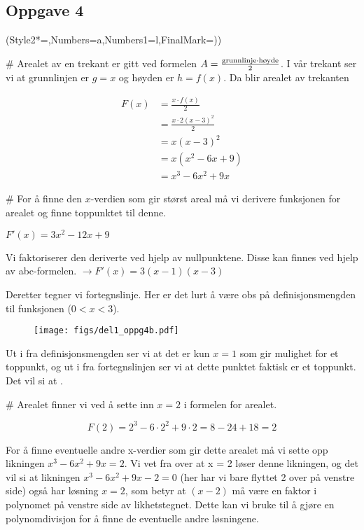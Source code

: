 \subsection*{Oppgave 4}
\begin{easylist}[enumerate]
	\ListProperties(Style2*=,Numbers=a,Numbers1=l,FinalMark={)})
	
	# Arealet av en trekant er gitt ved formelen $A = \frac{\textnormal{grunnlinje} \cdot \textnormal{høyde}}{2}$. I vår trekant ser vi at grunnlinjen er $g = x$ og høyden er $h = f(x)$. Da blir arealet av trekanten
	
	\begin{align*}
		F(x) & = \frac{x \cdot f(x)}{2} \\
		& = \frac{x \cdot 2(x-3)^2}{2} \\
		& = x(x-3)^2 \\
		& = x(x^2 - 6x + 9) \\
		& = x^3 - 6x^2 +9x
	\end{align*}
	
	# For å finne den $x$-verdien som gir størst areal må vi derivere funksjonen for arealet og finne toppunktet til denne. 
	
	$F'(x) = 3x^2 - 12x + 9$
	
	Vi faktoriserer den deriverte ved hjelp av nullpunktene. Disse kan finnes ved hjelp av abc-formelen. $\rightarrow F'(x) = 3(x-1)(x-3)$
	
	Deretter tegner vi fortegnslinje. Her er det lurt å være obs på definisjonsmengden til funksjonen ($0<x<3$).
	
		\begin{figure}[ht!]
			\centering
			\texttt{[image: figs/del1\_oppg4b.pdf]}
			\label{fig:del1_oppg4c}
		\end{figure}
		
		Ut i fra definisjonsmengden ser vi at det er kun $x = 1$ som gir mulighet for et toppunkt, og ut i fra fortegnslinjen ser vi at dette punktet faktisk er et toppunkt. Det vil si at .
		
	# Arealet finner vi ved å sette inn $x = 2$ i formelen for arealet.
	
	\[ F(2) = 2^3 - 6 \cdot 2^2 +9 \cdot 2 = 8 - 24 + 18 = 2 \]
	
	For å finne eventuelle andre x-verdier som gir dette arealet må vi sette opp likningen $x^3 - 6x^2 +9x = 2$. Vi vet fra over at x = 2 løser denne likningen, og det vil si at likningen $x^3 - 6x^2 +9x -2 = 0  $ (her har vi bare flyttet 2 over på venstre side) også har løsning $x=2$, som betyr at $(x-2)$ må være en faktor i polynomet på venstre side av likhetstegnet. Dette kan vi bruke til å gjøre en polynomdivisjon for å finne de eventuelle andre løsningene.
	

\end{easylist}
